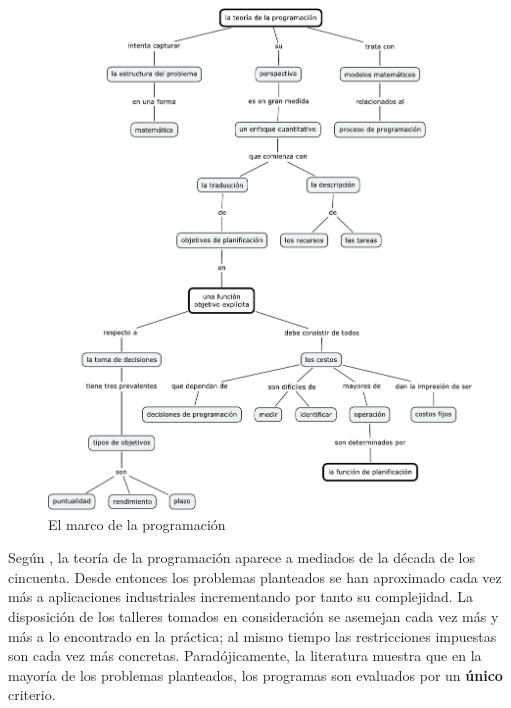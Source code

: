 \documentclass[spanish,draft,12pt,headsepline,footsepline,paper=letter]{scrreprt}
\begin{document}
\begin{figure}[hbtp]
\centering
\includegraphics[height=.90\textheight]{media/marco_programacion.pdf}
\caption[El marco de la programación]{El marco de la programación}
\label{fig:marco_programacion}
\end{figure}

Según \citet[p.~1]{TKindt2002}, la teoría de la programación aparece a mediados de la década de los cincuenta. Desde entonces los problemas planteados se han aproximado cada vez más a aplicaciones industriales incrementando por tanto su complejidad. La disposición de los talleres tomados en consideración se asemejan cada vez más y más a lo encontrado en la práctica; al mismo tiempo las restricciones impuestas son cada vez más concretas.  Paradójicamente, la literatura muestra que en la mayoría de los problemas planteados, los programas son evaluados por un \textbf{único} criterio.
\end{document}
